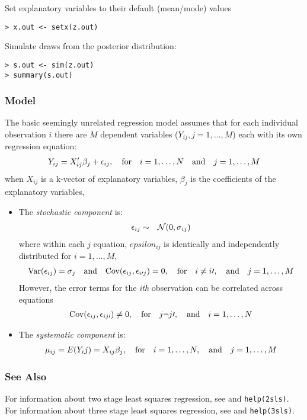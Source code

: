 Set explanatory variables to their default (mean/mode) values
\begin{verbatim}
> x.out <- setx(z.out)
\end{verbatim}

Simulate draws from the posterior distribution:
\begin{verbatim}
> s.out <- sim(z.out)
> summary(s.out)
\end{verbatim}
\clearpage
\subsubsection{Model}
The basic seemingly unrelated regression model assumes that for each individual
observation $i$ there are $M$ dependent variables ($Y_{ij}, j=1,\ldots,M$) 
each with its own regression equation:
\begin{eqnarray*}
Y_{ij} = X_{ij}'\beta_j + \epsilon_{ij}, \quad  {\rm for} \quad  i=1,\ldots,N \quad {\rm and} \quad  j=1,\ldots,M
\end{eqnarray*}
when $X_{ij}$ is a k-vector of explanatory variables, $\beta_j$
is the coefficients of the explanatory variables,
\begin{itemize}
\item The \emph{stochastic component} is:
\begin{eqnarray*}
\epsilon_{ij}  &  \sim & {\cal N}(0, \sigma_{ij})
\end{eqnarray*}
where within each $j$ equation, $epsilon_{ij}$ is identically
and independently distributed for $i=1,\ldots,M$,
\begin{eqnarray*}
{\rm Var}(\epsilon_{ij})=\sigma_j \quad {\rm and} \quad {\rm Cov}(\epsilon_{ij}, \epsilon_{i\prime j})= 0, \quad {\rm for} \quad i \neq i\prime,\quad {\rm and} \quad j=1,\ldots,M 
\end{eqnarray*}
However, the error terms for the \emph{ith} observation can be correlated across equations
\begin{eqnarray*}
{\rm Cov}(\epsilon_{ij}, \epsilon_{ij\prime})\neq 0, \quad {\rm for} \quad j \neg j\prime, \quad {\rm and} \quad i=1,\ldots,N 
\end{eqnarray*}
\item The \emph{systematic component} is:
\begin{eqnarray*}
\mu_{ij}= E(Y_ij)= X_{ij}\beta_j, \quad {\rm for} \quad  i=1,\ldots,N, \quad {\rm and} \quad j=1,\ldots,M 
\end{eqnarray*}
\end{itemize}
\subsubsection{See Also}
For information about two stage least squares regression, see 
 and \texttt{help(2sls)}.
For information about three stage least squares regression, see
 and \texttt{help(3sls)}.
